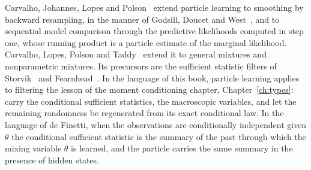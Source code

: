 Carvalho, Johannes, Lopes and Polson~\cite{cjlp2010} extend particle learning to smoothing by backward resampling, in the manner of Godsill, Doucet and West~\cite{gdw2004}, and to sequential model comparison through the predictive likelihoods computed in step one, whose running product is a particle estimate of the marginal likelihood. Carvalho, Lopes, Polson and Taddy~\cite{clpt2010} extend it to general mixtures and nonparametric mixtures. Its precursors are the sufficient statistic filters of Storvik~\cite{storvik2002} and Fearnhead~\cite{fearnhead2002}. In the language of this book, particle learning applies to filtering the lesson of the moment conditioning chapter, Chapter~\ref{ch:types}: carry the conditional sufficient statistics, the macroscopic variables, and let the remaining randomness be regenerated from its exact conditional law. In the language of de Finetti, when the observations are conditionally independent given $\theta$ the conditional sufficient statistic is the summary of the past through which the mixing variable $\theta$ is learned, and the particle carries the same summary in the presence of hidden states.
